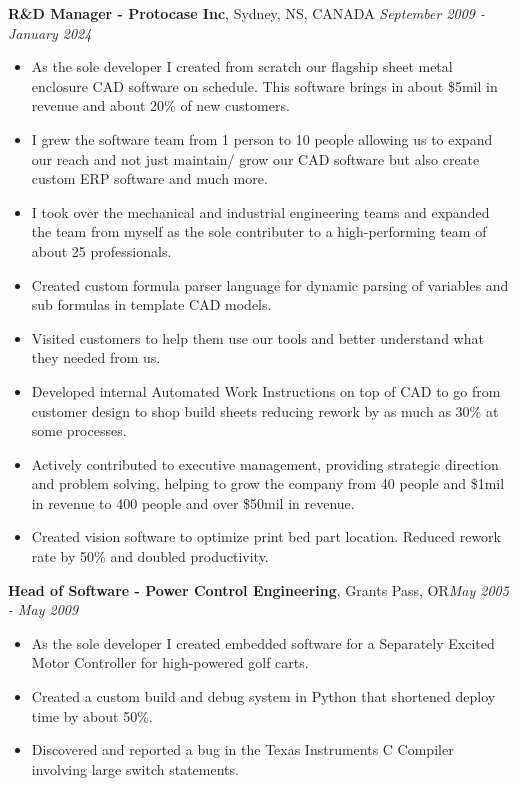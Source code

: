 \documentclass[letter,11pt]{article}
\begin{document}

\noindent
\textbf{R\&D Manager - Protocase Inc}, Sydney, NS, CANADA \hfill \textit{September 2009 - January 2024}
\begin{itemize}[leftmargin=*,itemsep=0pt, parsep=0pt,label=$\diamond$]
\item As the sole developer I created from scratch our flagship sheet metal enclosure CAD software on schedule. This software brings in about \$5mil in revenue and about 20\% of new customers.
\item I grew the software team from 1 person to 10 people allowing us to expand our reach and not just maintain/ grow our CAD software but also create custom ERP software and much more.
\item I took over the mechanical and industrial engineering teams and expanded the team from myself as the sole contributer to a high-performing team of about 25 professionals.
\item Created custom formula parser language for dynamic parsing of variables and sub formulas in template CAD models. 
\item Visited customers to help them use our tools and better understand what they needed from us.
\item Developed internal Automated Work Instructions on top of CAD to go from customer design to shop build sheets reducing rework by as much as 30\% at some processes.
\item Actively contributed to executive management, providing strategic direction and problem solving, helping to grow the company from 40 people and \$1mil in revenue to 400 people and over \$50mil in revenue.
\item Created vision software to optimize print bed part location. Reduced rework rate by 50\% and doubled productivity.
\end{itemize}

\noindent
\textbf{Head of Software - Power Control Engineering}, Grants Pass, OR\hfill \textit{May 2005 - May 2009}
\begin{itemize}[leftmargin=*,itemsep=0pt, parsep=0pt,label=$\diamond$]
\item As the sole developer I created embedded software for a Separately Excited Motor Controller for high-powered golf carts.
\item Created a custom build and debug system in Python that shortened deploy time by about 50\%.
\item Discovered and reported a bug in the Texas Instruments C Compiler involving large switch statements.
\end{itemize}
\end{document}
